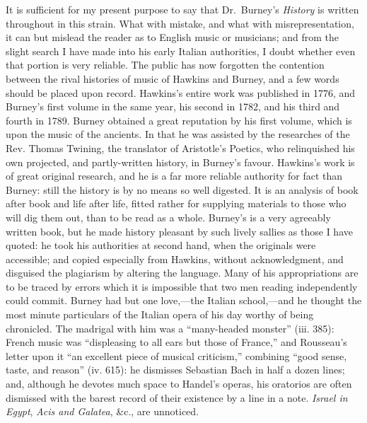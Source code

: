 It is sufficient for my present purpose to say that Dr.~Burney’s \textit{History} is
written throughout in this strain. What with mistake, and what with misrepresentation, it can but mislead the reader as to English music or musicians; and
from the slight search I have made into his early Italian authorities, I doubt
whether even that portion is very reliable. The public has now forgotten
the contention between the rival histories of music of Hawkins and Burney, and
a few words should be placed upon record. Hawkins’s entire work was published
in 1776, and Burney’s first volume in the same year, his second in 1782, and his
third and fourth in 1789. Burney obtained a great reputation by his first volume,
which is upon the music of the ancients. In that he was assisted by the researches
of the Rev. Thomas Twining, the translator of Aristotle’s Poetics, who relinquished
his own projected, and partly-written history, in Burney’s favour.
Hawkins’s work is of great original research, and he is a far more reliable
authority for fact than Burney: still the history is by no means so well digested.
It is an analysis of book after book and life after life, fitted rather for supplying
materials to those who will dig them out, than to be read as a whole. Burney’s
is a very agreeably written book, but he made history pleasant by such lively
sallies as those I have quoted: he took his authorities at second hand, when the
originals were accessible; and copied especially from Hawkins, without acknowledgment,
and disguised the plagiarism by altering the language. Many of his appropriations
are to be traced by errors which it is impossible that two men reading
independently could commit. Burney had but one love,—the Italian school,—and
he thought the most minute particulars of the Italian opera of his day worthy
of being chronicled. The madrigal with him was a “many-headed monster” (iii. 385): 
French music was \pagebreak “displeasing to all ears but those of France,” and 
Rousseau’s letter upon it “an excellent piece of musical criticism,” combining 
“good sense, taste, and reason” (iv. 615): he dismisses Sebastian Bach in half
a dozen lines; and, although he devotes much space to Handel’s operas, his
oratorios are often dismissed with the barest record of their existence by a line in
a note. \textit{Israel in Egypt}, \textit{Acis and Galatea}, \&c., are unnoticed.


